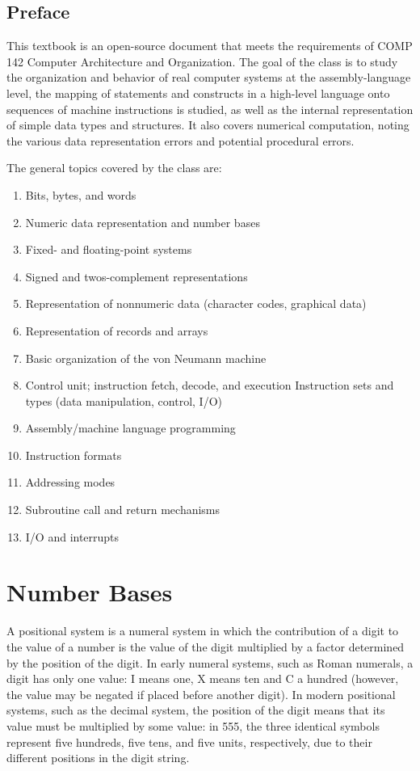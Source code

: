 \documentclass[letterpaper, 12pt]{book}
\begin{document}

\section{Preface\label{sec:preface}}

This textbook is an open-source document that meets the requirements of COMP 142 Computer Architecture and Organization. The goal of the class is to study the organization and behavior of real computer systems at the assembly-language level, the mapping of statements and constructs in a high-level language onto sequences of machine instructions is studied, as well as the internal representation of simple data types and structures. It also covers numerical computation, noting the various data representation errors and potential procedural errors.

The general topics covered by the class are:

\begin{enumerate}
\item Bits, bytes, and words
\item Numeric data representation and number bases
\item Fixed- and floating-point systems
\item Signed and twos-complement representations
\item Representation of nonnumeric data (character codes, graphical data)
\item Representation of records and arrays
\item Basic organization of the von Neumann machine
\item Control unit; instruction fetch, decode, and execution
    Instruction sets and types (data manipulation, control, I/O)
\item Assembly/machine language programming
\item Instruction formats
\item Addressing modes
\item Subroutine call and return mechanisms
\item I/O and interrupts
\end{enumerate}

\chapter{Number Bases\label{sec:numbers}}
\setcounter{examples}{1}

A positional system is a numeral system in which the contribution of a digit to the value of a number 
is the value of the digit multiplied by a factor determined by the position of the digit. In early 
numeral systems, such as Roman numerals, a digit has only one value: I means one, X means ten and C 
a hundred (however, the value may be negated if placed before another digit). In modern positional 
systems, such as the decimal system, the position of the digit means that its value must be multiplied 
by some value: in 555, the three identical symbols represent five hundreds, five tens, and five units, 
respectively, due to their different positions in the digit string. 
\end{document}
